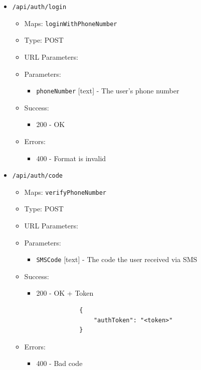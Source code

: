 \renewcommand{\labelitemii}{}
\renewcommand{\labelitemiii}{-}
\begin{itemize}
    \item \texttt{/api/auth/login}
    \begin{itemize}
        \item Maps: \texttt{loginWithPhoneNumber}
        \item Type: POST
        \item URL Parameters:
        \item Parameters:
        \begin{itemize}
            \item \texttt{phoneNumber} [text] - The user's phone number
        \end{itemize}
        \item Success:
        \begin{itemize}
            \item 200 - OK
        \end{itemize}
        \item Errors:
        \begin{itemize}
            \item 400 - Format is invalid
        \end{itemize}
    \end{itemize}
    
    \item \texttt{/api/auth/code}
    \begin{itemize}
        \item Maps: \texttt{verifyPhoneNumber}
        \item Type: POST
        \item URL Parameters:
        \item Parameters:
        \begin{itemize}
            \item \texttt{SMSCode} [text] - The code the user received via SMS
        \end{itemize}
        \item Success:
        \begin{itemize}
            \item 200 - OK + Token
            \begin{lstlisting}
            {
                "authToken": "<token>"
            }
            \end{lstlisting}
        \end{itemize}
        \item Errors:
        \begin{itemize}
            \item 400 - Bad code
        \end{itemize}
    \end{itemize}


\end{itemize}
